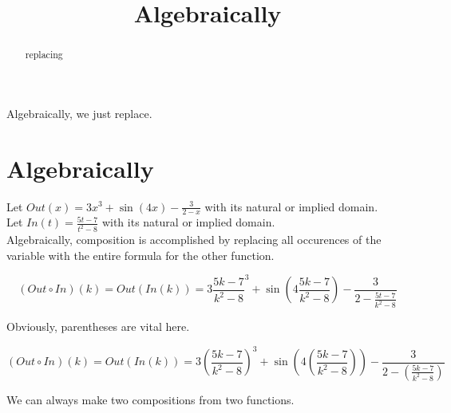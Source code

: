 \documentclass{ximera}
\title{Algebraically}
\begin{document}
\begin{abstract}
replacing
\end{abstract}
\maketitle








Algebraically, we just replace.


















\section{Algebraically}







Let $Out(x) = 3x^3 + \sin(4x) - \frac{3}{2-x}$ with its natural or implied domain. \\
Let $In(t) = \frac{5t-7}{t^2-8}$ with its natural or implied domain. \\



Algebraically, composition is accomplished by replacing all occurences of the variable with the entire formula for the other function.




\[
(Out \circ In)(k) = Out(In(k)) = 3 {\frac{5k-7}{k^2-8}}^3 + \sin(4 \frac{5k-7}{k^2-8}) - \frac{3}{2-\frac{5t-7}{k^2-8}}
\]





Obviously, parentheses are vital here.





\[
(Out \circ In)(k) = Out(In(k)) = 3 \left( \frac{5k-7}{k^2-8} \right)^3 + \sin\left( 4 \left( \frac{5k-7}{k^2-8} \right) \right) - \frac{3}{2 - \left( \frac{5k-7}{k^2-8} \right)}
\]






We can always make two compositions from two functions.
\end{document}
